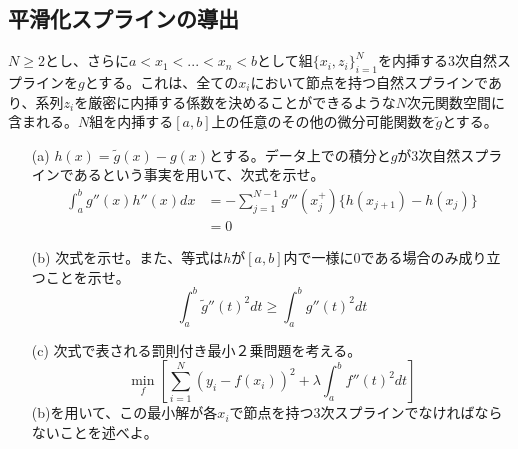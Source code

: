 \documentclass{jsarticle}
\begin{document}
\subsection{平滑化スプラインの導出}
\begin{shadebox}
$N\geq 2$とし、さらに$a<x_1<...<x_n< b$として組$\{x_i, z_i\}_{i=1}^{N}$を内挿する3次自然スプラインを$g$とする。これは、全ての$x_i$において節点を持つ自然スプラインであり、系列$z_i$を厳密に内挿する係数を決めることができるような$N$次元関数空間に含まれる。$N$組を内挿する$[a,b]$上の任意のその他の微分可能関数を$\tilde{g}$とする。
\begin{enumerate}
\item[(a)]
$h(x)=\tilde{g}(x)-g(x)$とする。データ上での積分と$g$が3次自然スプラインであるという事実を用いて、次式を示せ。
\begin{align*}
\int_{a}^{b}g''(x)h''(x)dx&=-\sum_{j=1}^{N-1}g'''(x_j^{+})\{h(x_{j+1})-h(x_j)\}\\
&=0
\end{align*}

\item[(b)]
次式を示せ。また、等式は$h$が$[a,b]$内で一様に$0$である場合のみ成り立つことを示せ。
\[\int_a^b \tilde{g}''(t)^2dt\geq\int_a^b g''(t)^2 dt\]

\item[(c)]
次式で表される罰則付き最小２乗問題を考える。
\[ \min_f [\sum_{i=1}^N (y_i-f(x_i))^2 + \lambda\int_a^b f''(t)^2dt]\]
(b)を用いて、この最小解が各$x_i$で節点を持つ3次スプラインでなければならないことを述べよ。
\end{enumerate}
\end{shadebox}
\end{document}
